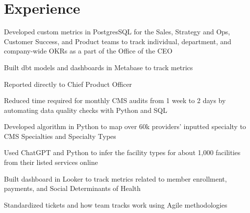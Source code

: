 \documentclass[a4paper]{deedy-resume-openfont} %
\begin{document}
\begin{minipage}[t]{0.66\textwidth} %

\section{Experience}
\vspace{\topsep} %
\begin{tightitemize}
	\item Developed custom metrics in PostgresSQL for the Sales, Strategy and Ops, Customer Success, and Product teams to track individual, department, and company-wide OKRs as a part of the Office of the CEO
	\item Built dbt models and dashboards in Metabase to track metrics
\end{tightitemize}

\begin{tightitemize}
	\item Reported directly to Chief Product Officer%
   	\item Reduced time required for monthly CMS audits from 1 week to 2 days by automating data quality checks with Python and SQL
   	\item Developed algorithm in Python to map over 60k providers' inputted specialty to CMS Specialties and Specialty Types %
   	\item Used ChatGPT and Python to infer the facility types for about 1,000 facilities from their listed services online
   	\item Built dashboard in Looker to track metrics related to member enrollment, payments, and Social Determinants of Health
	\item Standardized tickets and how team tracks work using Agile methodologies
\end{tightitemize}


\end{minipage}
\end{document}
